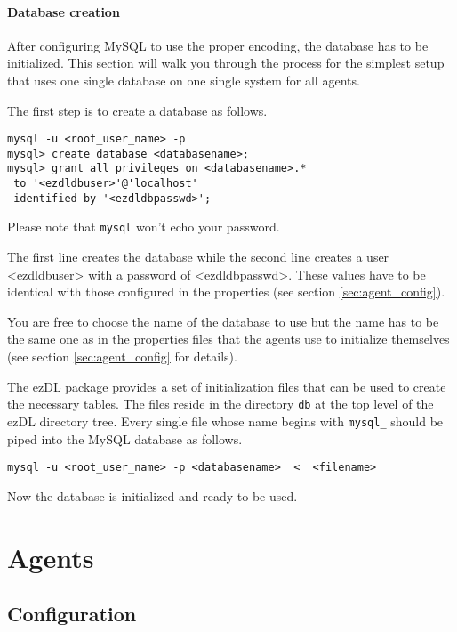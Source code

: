 \documentclass[12pt]{book}
\begin{document}
\subsubsection{Database creation}

After configuring MySQL to use the proper encoding, the database has to be initialized. This section will walk you through the process for the simplest setup that uses one single database on one single system for all agents.

The first step is to create a database as follows.

\begin{verbatim}
mysql -u <root_user_name> -p
mysql> create database <databasename>;
mysql> grant all privileges on <databasename>.* 
 to '<ezdldbuser>'@'localhost' 
 identified by '<ezdldbpasswd>';
\end{verbatim}

Please note that {\tt mysql} won't echo your password.

The first line creates the database while the second line creates a user <ezdldbuser> with a password of <ezdldbpasswd>. These values have to be identical with those configured in the properties (see section \ref{sec:agent_config}).

You are free to choose the name of the database to use but the name has to be the same one as in the properties files that the agents use to initialize themselves (see section \ref{sec:agent_config} for details).

The ezDL package provides a set of initialization files that can be used to create the necessary tables. The files reside in the directory {\tt db} at the top level of the ezDL directory tree. Every single file whose name begins with {\tt mysql\_} should be piped into the MySQL database as follows.

\begin{verbatim}
mysql -u <root_user_name> -p <databasename>  <  <filename>
\end{verbatim}

Now the database is initialized and ready to be used.


\chapter{Agents}

\section{Configuration\label{sec:agent_config}}
  
\end{document}
